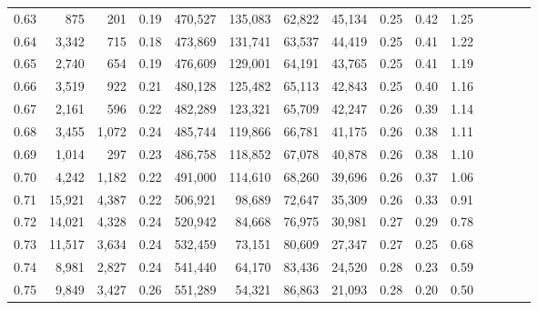 \begin{tabular}{rrrcrrrrrrrrrrr}
0.63 &     875 &    201 &                                       0.19 &  470,527 &  135,083 &   62,822 &   45,134 &  0.25 &  0.42 &                         1.25 \\
0.64 &   3,342 &    715 &                                       0.18 &  473,869 &  131,741 &   63,537 &   44,419 &  0.25 &  0.41 &                         1.22 \\
0.65 &   2,740 &    654 &                                       0.19 &  476,609 &  129,001 &   64,191 &   43,765 &  0.25 &  0.41 &                         1.19 \\
0.66 &   3,519 &    922 &                                       0.21 &  480,128 &  125,482 &   65,113 &   42,843 &  0.25 &  0.40 &                         1.16 \\
0.67 &   2,161 &    596 &                                       0.22 &  482,289 &  123,321 &   65,709 &   42,247 &  0.26 &  0.39 &                         1.14 \\
0.68 &   3,455 &  1,072 &                                       0.24 &  485,744 &  119,866 &   66,781 &   41,175 &  0.26 &  0.38 &                         1.11 \\
0.69 &   1,014 &    297 &                                       0.23 &  486,758 &  118,852 &   67,078 &   40,878 &  0.26 &  0.38 &                         1.10 \\
0.70 &   4,242 &  1,182 &                                       0.22 &  491,000 &  114,610 &   68,260 &   39,696 &  0.26 &  0.37 &                         1.06 \\
0.71 &  15,921 &  4,387 &                                       0.22 &  506,921 &   98,689 &   72,647 &   35,309 &  0.26 &  0.33 &                         0.91 \\
0.72 &  14,021 &  4,328 &                                       0.24 &  520,942 &   84,668 &   76,975 &   30,981 &  0.27 &  0.29 &                         0.78 \\
0.73 &  11,517 &  3,634 &                                       0.24 &  532,459 &   73,151 &   80,609 &   27,347 &  0.27 &  0.25 &                         0.68 \\
0.74 &   8,981 &  2,827 &                                       0.24 &  541,440 &   64,170 &   83,436 &   24,520 &  0.28 &  0.23 &                         0.59 \\
0.75 &   9,849 &  3,427 &                                       0.26 &  551,289 &   54,321 &   86,863 &   21,093 &  0.28 &  0.20 &                         0.50 \\

\end{tabular}

